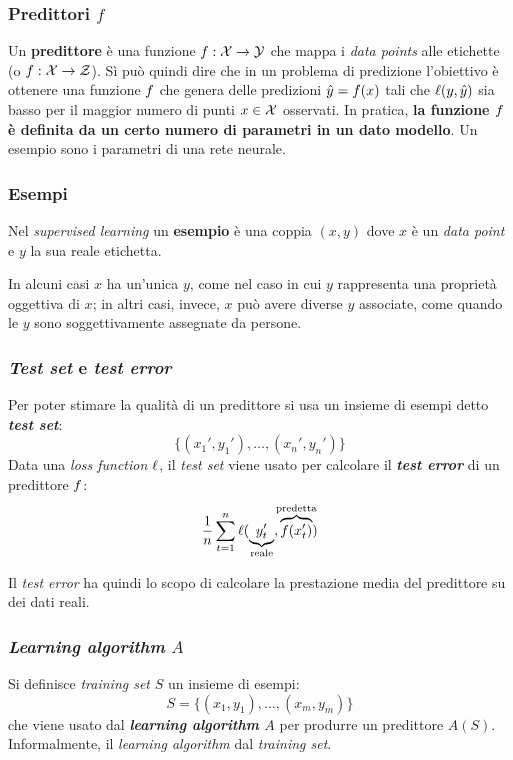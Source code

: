 \subsubsection{Predittori \texorpdfstring{$f$}{f}}

Un \textbf{predittore} è una funzione $f:\mathcal{X} \rightarrow \mathcal{Y}$ che mappa i
\textit{data points} alle etichette (o $f:\mathcal{X} \rightarrow \mathcal{Z}$). Sì può quindi
dire che in un problema di predizione l'obiettivo è ottenere una funzione $f$ 
che genera delle predizioni $\hat{y} = f(x)$ tali che $\ell(y,\hat{y})$ sia
basso per il maggior numero di punti $x \in \mathcal{X}$ osservati. In pratica, \textbf{la 
funzione $f$ è definita da un certo numero di parametri in un dato modello}. Un
esempio sono i parametri di una rete neurale.

\subsubsection{Esempi}
Nel \textit{supervised learning} un \textbf{esempio} è una coppia $(x,y)$ dove $x$
è un \textit{data point} e $y$ la sua reale etichetta.

In alcuni casi $x$ ha un'unica $y$, come nel caso in cui $y$ rappresenta una proprietà
oggettiva di $x$; in altri casi, invece, $x$ può avere diverse $y$ associate, come
quando le $y$ sono soggettivamente assegnate da persone.

\subsubsection{\textit{Test set} e \textit{test error}}
Per poter stimare la qualità di un predittore si usa un insieme di esempi detto
\textbf{\textit{test set}}:
$$ \{ (x_1',y_1'),\dots, (x_n',y_n')\} $$
Data una \textit{loss function} $\ell$, il \textit{test set} viene usato per
calcolare il \textit{\textbf{test error}} di un predittore $f$:
$$ \frac{1}{n}\sum^{n}_{t=1}{
    \loss(\underbrace{y_t'}_{\mathclap{\text{reale}}},
    \overbrace{\pred(x_t')}^{\mathclap{\text{predetta}}})} $$

Il \textit{test error} ha quindi lo scopo di calcolare la prestazione media del 
predittore su dei dati reali.

\subsubsection{\textit{Learning algorithm} \texorpdfstring{$A$}{A}}
Si definisce \textit{training set} $S$ un insieme di esempi:
$$ S = \{(x_1,y_1),\dots,(x_m,y_m)\} $$
che viene usato dal \textbf{\textit{learning algorithm} $A$} per produrre un predittore
$A(S)$.
Informalmente, il \textit{learning algorithm}  dal \textit{training set}.

